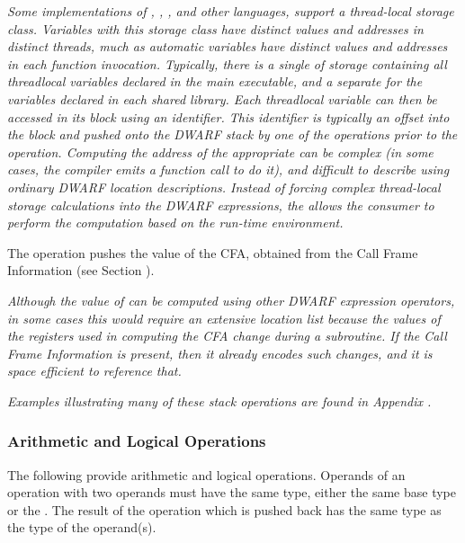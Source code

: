\begin{enumerate}[1. ]
\textit{Some implementations of 
, , , and other 
languages, support a 
thread-local storage class. Variables with this storage class
have distinct values and addresses in distinct threads, much
as automatic variables have distinct values and addresses in
each function invocation. Typically, there is a single 
of storage containing all thread\dash local variables declared in
the main executable, and a separate  for the variables
declared in each shared library. Each 
thread\dash local variable can then be accessed in its block using an
identifier. This identifier is typically an offset into the block and 
pushed onto the DWARF stack by one of the 
\DWOPconstnx{} operations prior to the
\DWOPformtlsaddress{} operation. 
Computing the address of
the appropriate  can be complex (in some cases, the
compiler emits a function call to do it), and difficult
to describe using ordinary DWARF location descriptions.
Instead of    forcing complex thread-local storage calculations into 
the DWARF expressions, the \DWOPformtlsaddress{} allows the consumer 
to perform the computation based on the run-time environment.}

\itembfnl{\DWOPcallframecfaTARG}
The \DWOPcallframecfaNAME{} 
operation pushes the value of the
CFA, obtained from the Call Frame Information 
(see Section ).

\textit{Although the value of \DWATframebase{}
can be computed using other DWARF expression operators,
in some cases this would require an extensive location list
because the values of the registers used in computing the
CFA change during a subroutine. If the 
Call Frame Information 
is present, then it already encodes such changes, and it is
space efficient to reference that.}
\end{enumerate}

\textit{Examples illustrating many of these stack operations are
found in Appendix .}

\subsubsection{Arithmetic and Logical Operations} 
The following provide arithmetic and logical operations. 
Operands of an operation with two operands
must have the same type,
either the same base type or the \generictype.
The result of the operation which is pushed back has the same type
as the type of the operand(s).  

